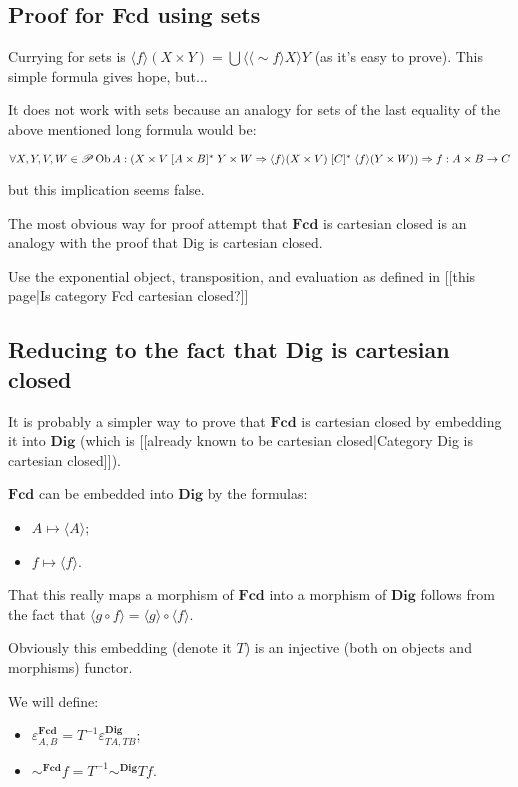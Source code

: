 \subsection{Proof for Fcd using sets}

Currying for sets is $\langle f \rangle ( X \times Y) = \bigcup \langle \langle \sim f \rangle X
\rangle Y$ (as it's easy to prove). This simple formula gives hope, but...

It does not work with sets because an analogy for sets of the last equality of the above mentioned long formula would be:

$\forall X, Y, V, W \in \mathscr{P} \operatorname{Ob} A : \left( X \times V \mathrel{[
A \times B]^{\ast}} Y \times W \Rightarrow \langle f \rangle ( X \times V)
\mathrel{[ C]^{\ast}} \langle f \rangle ( Y \times W) \right) \Rightarrow \\ f : A
\times B \rightarrow C$

but this implication seems false.

The most obvious way for proof attempt that $\mathbf{Fcd}$ is cartesian closed is an analogy with the proof that Dig is cartesian closed.

Use the exponential object, transposition, and evaluation as defined in [[this page|Is category Fcd cartesian closed?]]

\subsection{Reducing to the fact that Dig is cartesian closed}
It is probably a simpler way to prove that $\mathbf{Fcd}$ is cartesian closed by embedding it into $\mathbf{Dig}$ (which is [[already known to be cartesian closed|Category Dig is cartesian closed]]).

$\mathbf{Fcd}$ can be embedded into $\mathbf{Dig}$ by the formulas:
\begin{itemize}
\item $A \mapsto \langle A \rangle$;
\item $f \mapsto \langle f \rangle$.
\end{itemize}

That this really maps a morphism of $\mathbf{Fcd}$ into a morphism of $\mathbf{Dig}$ follows from the fact that $\langle g\circ f\rangle = \langle g\rangle\circ\langle f\rangle$.

Obviously this embedding (denote it $T$) is an injective (both on objects and morphisms) functor.

We will define:
\begin{itemize}
\item $\varepsilon^{\mathbf{Fcd}}_{A, B} = T^{-1} \varepsilon^{\mathbf{Dig}}_{T A, T B}$;
\item $\sim^{\mathbf{Fcd}} f = T^{-1} \sim^{\mathbf{Dig}} T f$.
\end{itemize}

